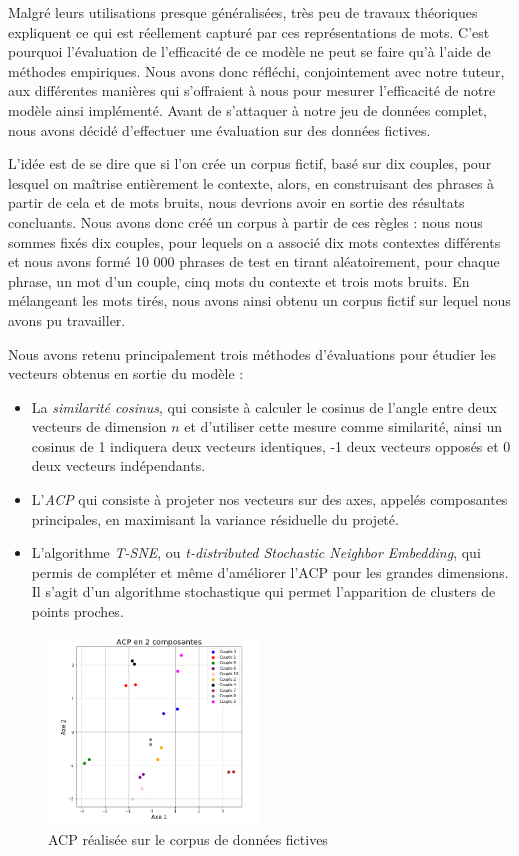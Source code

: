 \documentclass[11pt,french,french]{article}
\begin{document}
Malgré leurs utilisations presque généralisées, très peu de travaux
théoriques expliquent ce qui est réellement capturé par ces
représentations de mots. C'est pourquoi l'évaluation de l'efficacité de
ce modèle ne peut se faire qu'à l'aide de méthodes empiriques. Nous
avons donc réfléchi, conjointement avec notre tuteur, aux différentes
manières qui s'offraient à nous pour mesurer l'efficacité de notre
modèle ainsi implémenté. Avant de s'attaquer à notre jeu de données
complet, nous avons décidé d'effectuer une évaluation sur des données
fictives.

L'idée est de se dire que si l'on crée un corpus fictif, basé sur dix
couples, pour lesquel on maîtrise entièrement le contexte, alors, en
construisant des phrases à partir de cela et de mots bruits, nous
devrions avoir en sortie des résultats concluants. Nous avons donc créé
un corpus à partir de ces règles : nous nous sommes fixés dix couples,
pour lequels on a associé dix mots contextes différents et nous avons
formé 10 000 phrases de test en tirant aléatoirement, pour chaque
phrase, un mot d'un couple, cinq mots du contexte et trois mots bruits.
En mélangeant les mots tirés, nous avons ainsi obtenu un corpus fictif
sur lequel nous avons pu travailler.

Nous avons retenu principalement trois méthodes d'évaluations pour
étudier les vecteurs obtenus en sortie du modèle :

\begin{itemize}
 \item La \textit{similarité cosinus}, qui consiste à calculer le cosinus de l'angle entre deux vecteurs de dimension $n$ et d'utiliser cette mesure comme similarité, ainsi un cosinus de 1 indiquera deux vecteurs identiques, -1 deux vecteurs opposés et 0 deux vecteurs indépendants.
 \item L'\textit{ACP} qui consiste à projeter nos vecteurs sur des axes, appelés composantes principales, en maximisant la variance résiduelle du projeté. 
 \item L'algorithme \textit{T-SNE}, ou \textit{t-distributed Stochastic Neighbor Embedding}, qui permis de compléter et même d'améliorer l'ACP pour les grandes dimensions. Il s'agit d'un algorithme stochastique qui permet l'apparition de clusters de points proches.
\end{itemize}

\begin{figure}
\centering
\includegraphics[width=0.50000\textwidth]{acp_fictif.png}
\caption{ACP réalisée sur le corpus de données fictives}
\end{figure}
\end{document}
